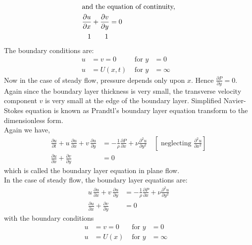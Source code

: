 \documentclass[../main-sheet.tex]{subfiles}
\begin{document}
\begin{soln}
\begin{align*}
        \intertext{and the equation of continuity,}
        \frac{\partial u}{\partial x }+\frac{\partial v}{\partial y }&=0\\
        1\quad\quad 1\,&
    \end{align*}
    The boundary conditions are:\\
    \begin{align*}
        u&=v=0 &\text{ for }y&=0&\\
        u&=U(x,t) &\text{ for }y&=\infty&
    \end{align*}
    Now in the case of steady flow, pressure depends only upon \(x \). Hence \(\frac{\partial P }{\partial y }=0\). Again since the boundary layer thickness is very small, the transverse velocity component \(v \) is very small at the edge of the boundary layer. Simplified Navier-Stokes equation is known as Prandtl's boundary layer equation transform to the dimensionless form.\\
    Again we have,
    \begin{align*}
        {\frac{\partial u}{\partial t }}+{u}\,{\frac{\partial u}{\partial x }}+{v}\,\frac{\partial u}{\partial y }&=-\frac{1}{\rho}\frac{\partial P}{\partial x }+
        \nu  \frac{\partial^2 u }{\partial y^2}\quad[\text{ neglecting }\frac{\partial^2 u }{\partial x^2}]\\
        \frac{\partial u}{\partial x }+\frac{\partial v}{\partial y }&=0
    \end{align*}
    which is called the boundary layer equation in plane flow.\\
    In the case of steady flow, the boundary layer equations are:
    \begin{align*}
        {u}\,{\frac{\partial u}{\partial x }}+{v}\,\frac{\partial u}{\partial y }&=-\frac{1}{\rho}\frac{\partial P}{\partial x }+
        \nu  \frac{\partial^2 u }{\partial y^2}\\
        \frac{\partial u}{\partial x }+\frac{\partial v}{\partial y }&=0
    \end{align*}
    with the boundary conditions
    \begin{align*}
        u&=v=0 &\text{ for }y&=0&\\
        u&=U(x) &\text{ for }y&=\infty&
    \end{align*}
\end{soln}
\end{document}
